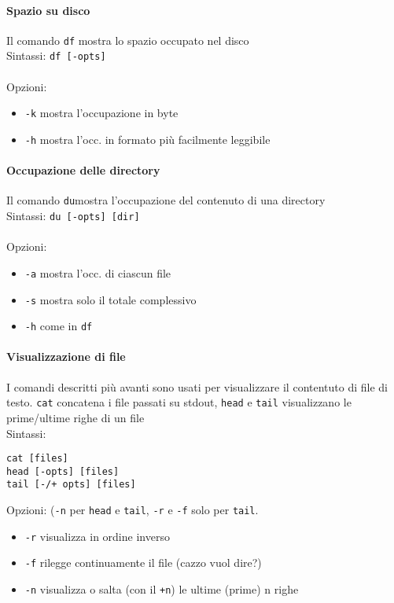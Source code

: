 \documentclass[a4paper]{article}
\begin{document}
\paragraph{Spazio su disco} Il comando \verb|df| mostra lo spazio occupato nel disco \\
Sintassi: \verb|df [-opts]| \\ \\
Opzioni:
\begin{itemize}
\item \verb|-k| mostra l'occupazione in byte
\item \verb|-h| mostra l'occ. in formato più facilmente leggibile
\end{itemize}
\paragraph{Occupazione delle directory} Il comando \verb|du|mostra l'occupazione del contenuto di una directory \\
Sintassi: \verb|du [-opts] [dir]| \\ \\
Opzioni:
\begin{itemize}
\item \verb|-a| mostra l'occ. di ciascun file
\item \verb|-s| mostra solo il totale complessivo
\item \verb|-h| come in \verb|df|
\end{itemize}
\paragraph{Visualizzazione di file} I comandi descritti più avanti sono usati per visualizzare il contentuto di file di testo. \verb|cat| concatena i file passati su stdout, \verb|head| e \verb|tail| visualizzano le prime/ultime righe di un file \\
Sintassi:
\begin{verbatim}
cat [files]
head [-opts] [files]
tail [-/+ opts] [files]
\end{verbatim}

Opzioni: (\verb|-n| per \verb|head| e \verb|tail|, \verb|-r| e \verb|-f| solo per \verb|tail|.
\begin{itemize}
\item \verb|-r| visualizza in ordine inverso
\item \verb|-f| rilegge continuamente il file (cazzo vuol dire?)
\item \verb|-n| visualizza o salta (con il \verb|+n|) le ultime (prime) n righe
\end{itemize}
\end{document}
